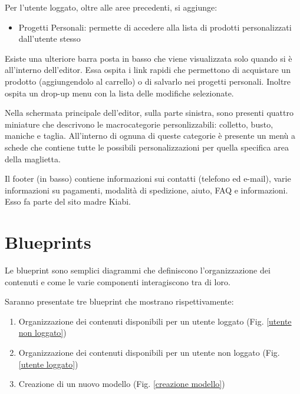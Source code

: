 \documentclass[12pt,italian,]{report}
\providecommand{\tightlist}{%
  \setlength{\itemsep}{0pt}\setlength{\parskip}{0pt}}
\begin{document}
Per l'utente loggato, oltre alle aree precedenti, si aggiunge:

\begin{itemize}
\tightlist
\item
  Progetti Personali: permette di accedere alla lista di prodotti   personalizzati dall'utente stesso
\end{itemize}

Esiste una ulteriore barra posta in basso che viene visualizzata solo
quando si è all'interno dell'editor. Essa ospita i link rapidi che
permettono di acquistare un prodotto (aggiungendolo al carrello) o di
salvarlo nei progetti personali. Inoltre ospita un drop-up menu con la
lista delle modifiche selezionate.

Nella schermata principale dell'editor, sulla parte sinistra, sono presenti quattro miniature che descrivono le macrocategorie personlizzabili: colletto, busto, maniche e taglia. All'interno di ognuna di queste categorie è presente un menù a schede che contiene tutte le possibili personalizzazioni per quella specifica area della maglietta. 

Il footer (in basso) contiene informazioni sui contatti (telefono ed e-mail), varie informazioni su pagamenti, modalità di spedizione, aiuto, FAQ e informazioni. Esso fa parte del sito madre Kiabi.

\hypertarget{blueprints}{%
\section{Blueprints}\label{blueprints}}

Le blueprint sono semplici diagrammi che definiscono l'organizzazione dei contenuti e come le varie componenti interagiscono tra di loro.

Saranno presentate tre blueprint che mostrano rispettivamente:

\begin{enumerate}
\def\labelenumi{\arabic{enumi}.}
\item
  Organizzazione dei contenuti disponibili per un utente loggato (Fig. \ref{utente non loggato})
\item
  Organizzazione dei contenuti disponibili per un utente non loggato (Fig. \ref{utente loggato})
\item
  Creazione di un nuovo modello (Fig. \ref{creazione modello})
\end{enumerate}
\end{document}
